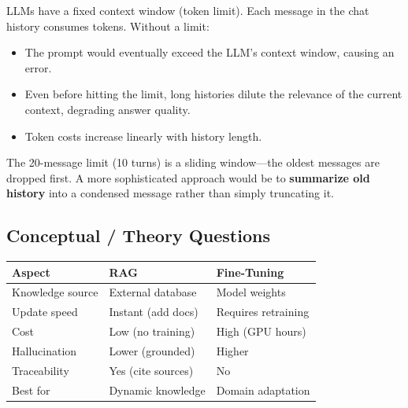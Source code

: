 \documentclass[12pt,a4paper]{article}
\begin{document}
\begin{interviewbox}
\end{interviewbox}
\begin{answerbox}
LLMs have a fixed context window (token limit). Each message in the chat history consumes tokens. Without a limit:
\begin{itemize}
  \item The prompt would eventually exceed the LLM's context window, causing an error.
  \item Even before hitting the limit, long histories dilute the relevance of the current context, degrading answer quality.
  \item Token costs increase linearly with history length.
\end{itemize}
The 20-message limit (10 turns) is a sliding window—the oldest messages are dropped first. A more sophisticated approach would be to \textbf{summarize old history} into a condensed message rather than simply truncating it.
\end{answerbox}

\subsection{Conceptual / Theory Questions}

\begin{interviewbox}
\end{interviewbox}
\begin{answerbox}
\begin{longtable}{@{}p{4cm}p{5cm}p{5cm}@{}}
\toprule
\textbf{Aspect} & \textbf{RAG} & \textbf{Fine-Tuning} \\
\midrule
Knowledge source & External database & Model weights \\
Update speed & Instant (add docs) & Requires retraining \\
Cost & Low (no training) & High (GPU hours) \\
Hallucination & Lower (grounded) & Higher \\
Traceability & Yes (cite sources) & No \\
Best for & Dynamic knowledge & Domain adaptation \\
\bottomrule
\end{longtable}
\end{answerbox}
\end{document}
